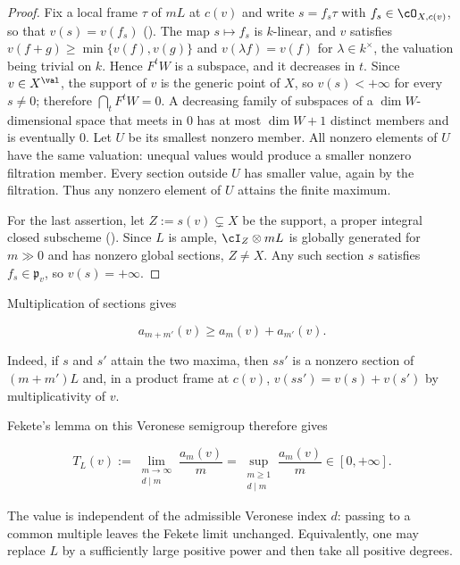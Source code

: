 \begin{proof}
Fix a local frame $\tau$ of $mL$ at $c(v)$ and write $s=f_s\tau$
with $f_s\in\cO_{X,c(v)}$, so that $v(s)=v(f_s)$
().  The map $s\mapsto f_s$ is
$k$-linear, and $v$ satisfies $v(f+g)\ge\min\{v(f),v(g)\}$ and
$v(\lambda f)=v(f)$ for $\lambda\in k^\times$, the valuation being
trivial on $k$.  Hence $F^tW$ is a subspace, and it decreases in $t$.
Since $v\in X^{\val}$, the support of $v$ is the generic point of
$X$, so $v(s)<+\infty$ for every $s\ne0$; therefore
$\bigcap_{t}F^tW=0$.  A decreasing family of subspaces of a
$\dim W$-dimensional space that meets in $0$ has at most $\dim W+1$ distinct members and is eventually $0$.
Let $U$ be its smallest nonzero member.  All nonzero elements of $U$
have the same valuation: unequal values would produce a smaller nonzero
filtration member.  Every section outside $U$ has smaller value, again
by the filtration.  Thus any nonzero element of $U$ attains the finite
maximum.

For the last assertion, let $Z:=s(v)\subsetneq X$ be the support, a
proper integral closed subscheme ().  Since
$L$ is ample, $\cI_Z\otimes mL$ is globally generated for $m\gg0$ and
has nonzero global sections, $Z\ne X$.  Any such section $s$ satisfies
$f_s\in\mathfrak p_v$, so $v(s)=+\infty$.
\end{proof}

Multiplication of sections gives

\[
                         a_{m+m'}(v)\geq a_m(v)+a_{m'}(v).
\tag{49.2}\label{eq:bj-vanishing-superadditive}
\]

Indeed, if $s$ and $s'$ attain the two maxima, then $ss'$ is a
nonzero section of $(m+m')L$ and, in a product frame at $c(v)$,
$v(ss')=v(s)+v(s')$ by multiplicativity of $v$.

Fekete's lemma on this Veronese semigroup therefore gives

\[
 T_L(v):=\lim_{\substack{m\to\infty\\d\mid m}}\frac{a_m(v)}m
        =\sup_{\substack{m\geq1\\d\mid m}}\frac{a_m(v)}m
        \in[0,+\infty].
\tag{49.3}\label{eq:bj-maximal-vanishing}
\]

The value is independent of the admissible Veronese index $d$: passing
to a common multiple leaves the Fekete limit unchanged.  Equivalently, one
may replace $L$ by a sufficiently large positive power and then take all
positive degrees.

